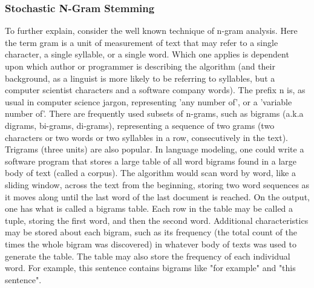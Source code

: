 \subsubsection{Stochastic N-Gram Stemming}
To further explain, consider the well known technique of n-gram analysis. Here the term gram is a unit of measurement of text that may refer to a single character, a single syllable, or a single word. Which one applies is dependent upon which author or programmer is describing the algorithm (and their background, as a linguist is more likely to be referring to syllables, but a computer scientist characters and a software company words). The prefix n is, as usual in computer science jargon, representing 'any number of', or a 'variable number of'. There are frequently used subsets of n-grams, such as bigrams (a.k.a digrams, bi-grams, di-grams), representing a sequence of two grams (two characters or two words or two syllables in a row, consecutively in the text). Trigrams (three units) are also popular.
In language modeling, one could write a software program that stores a large table of all word bigrams found in a large body of text (called a corpus). The algorithm would scan word by word, like a sliding window, across the text from the beginning, storing two word sequences as it moves along until the last word of the last document is reached. On the output, one has what is called a bigrams table. Each row in the table may be called a tuple, storing the first word, and then the second word. Additional characteristics may be stored about each bigram, such as its frequency (the total count of the times the whole bigram was discovered) in whatever body of texts was used to generate the table. The table may also store the frequency of each individual word. For example, this sentence contains bigrams like "for example" and "this sentence".
